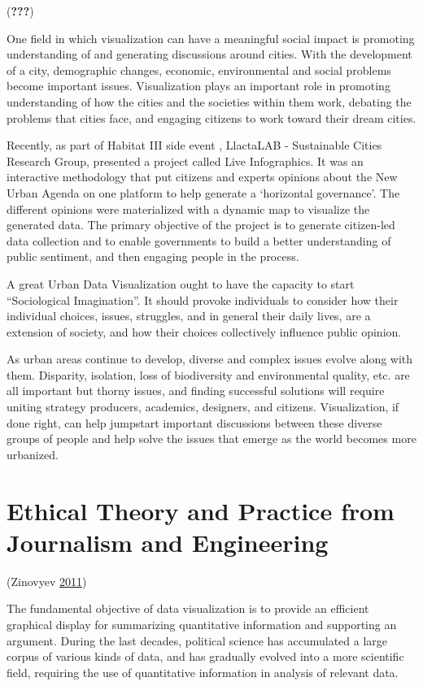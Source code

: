 \documentclass[]{book}
\theoremstyle{definition}
\theoremstyle{definition}
\theoremstyle{definition}
\theoremstyle{remark}
\begin{document}
({\textbf{???}})

One field in which visualization can have a meaningful social impact is
promoting understanding of and generating discussions around cities.
With the development of a city, demographic changes, economic,
environmental and social problems become important issues. Visualization
plays an important role in promoting understanding of how the cities and
the societies within them work, debating the problems that cities face,
and engaging citizens to work toward their dream cities.

Recently, as part of Habitat III side event , LlactaLAB - Sustainable
Cities Research Group, presented a project called Live Infographics. It
was an interactive methodology that put citizens and experts opinions
about the New Urban Agenda on one platform to help generate a
`horizontal governance'. The different opinions were materialized with a
dynamic map to visualize the generated data. The primary objective of
the project is to generate citizen-led data collection and to enable
governments to build a better understanding of public sentiment, and
then engaging people in the process.

A great Urban Data Visualization ought to have the capacity to start
``Sociological Imagination''. It should provoke individuals to consider
how their individual choices, issues, struggles, and in general their
daily lives, are a extension of society, and how their choices
collectively influence public opinion.

As urban areas continue to develop, diverse and complex issues evolve
along with them. Disparity, isolation, loss of biodiversity and
environmental quality, etc. are all important but thorny issues, and
finding successful solutions will require uniting strategy producers,
academics, designers, and citizens. Visualization, if done right, can
help jumpstart important discussions between these diverse groups of
people and help solve the issues that emerge as the world becomes more
urbanized.

\section{Ethical Theory and Practice from Journalism and
Engineering}\label{ethical-theory-and-practice-from-journalism-and-engineering}

(Zinovyev \protect\hyperlink{ref-poli_social_science}{2011})

The fundamental objective of data visualization is to provide an
efficient graphical display for summarizing quantitative information and
supporting an argument. During the last decades, political science has
accumulated a large corpus of various kinds of data, and has gradually
evolved into a more scientific field, requiring the use of quantitative
information in analysis of relevant data.
\end{document}
